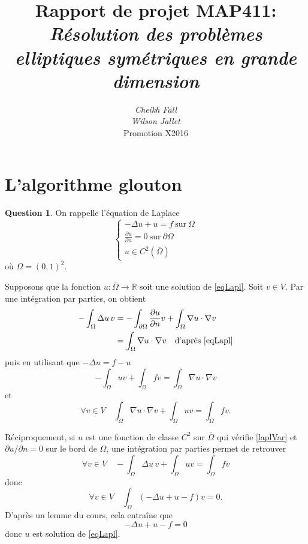\documentclass[11pt]{article}
\title{
	\textbf{Rapport de projet MAP411}:\\
	\textit{Résolution des problèmes elliptiques symétriques en grande dimension}}
\author{
	\textit{Cheikh Fall}\\
	\textit{Wilson Jallet}\\
Promotion X2016}
\newcommand{\RR}{\mathbb{R}}
\theoremstyle{definition}
\newtheorem{ques}{Question}
\begin{document}
\maketitle

\section{L'algorithme glouton}

\setlength{\parindent}{1cm}
\setlength{\parskip}{3mm}

\begin{ques}
On rappelle l'équation de Laplace
\begin{equation}\label{eqLapl}
\left\{
\begin{array}{l}
-\Delta u + u = f\ \text{sur}\ \Omega \\
\frac{\partial u}{\partial n} = 0\ \text{sur}\ \partial\Omega \\
u \in C^2(\overline{\Omega})
\end{array}
\right.
\end{equation}
où $\Omega = (0,1)^2$.

Supposons que la fonction $u:\overline\Omega\longrightarrow\RR$ soit une solution de \eqref{eqLapl}. Soit $v\in V$. Par une intégration par parties, on obtient
\begin{align*}
-\int_\Omega \Delta u\, v &= -\int_{\partial\Omega} \frac{\partial u}{\partial n}v + \int_\Omega \nabla u\cdot \nabla v \\
&= \int_\Omega \nabla u\cdot \nabla v \quad \text{d'après \eqref{eqLapl}}
\end{align*}
puis en utilisant que $-\Delta u = f-u$
\[
	-\int_\Omega uv + \int_\Omega fv = \int_\Omega \nabla u\cdot \nabla v
\]
et
\begin{equation}\label{laplVar}
\forall v\in V\quad
\int_\Omega \nabla u\cdot \nabla v + \int_\Omega uv = \int_\Omega fv.
\end{equation}


Réciproquement, si $u$ est une fonction de classe $C^2$ sur $\overline\Omega$ qui vérifie \eqref{laplVar} et $\partial u/\partial n = 0$ sur le bord de $\Omega$, une intégration par parties permet de retrouver 
\[
\forall v\in V\quad  -\int_\Omega \Delta u\, v + \int_\Omega uv = \int_\Omega fv
\]
donc
\[
\forall v\in V\quad \int_\Omega (-\Delta u + u -f)v = 0.
\]
D'après un lemme du cours, cela entraîne que\[ -\Delta u+ u -f = 0  \]
donc $u$ est solution de \eqref{eqLapl}.

\end{ques}
\end{document}
